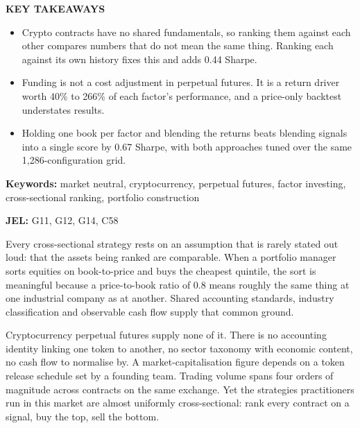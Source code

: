 \documentclass[12pt]{article}
\begin{document}
\vspace{18pt}
\noindent\textbf{KEY TAKEAWAYS}

\begin{itemize}\setlength{\itemsep}{6pt}\setlength{\parskip}{0pt}
\item Crypto contracts have no shared fundamentals, so ranking them against each
other compares numbers that do not mean the same thing. Ranking each against its
own history fixes this and adds 0.44 Sharpe.

\item Funding is not a cost adjustment in perpetual futures. It is a return
driver worth 40\% to 266\% of each factor's performance, and a price-only
backtest understates results.

\item Holding one book per factor and blending the returns beats blending signals
into a single score by 0.67 Sharpe, with both approaches tuned over the same
1,286-configuration grid.
\end{itemize}

\vspace{18pt}
\noindent\textbf{Keywords:} market neutral, cryptocurrency, perpetual futures,
factor investing, cross-sectional ranking, portfolio construction

\noindent\textbf{JEL:} G11, G12, G14, C58

\newpage

\indent Every cross-sectional strategy rests on an assumption that is rarely stated out
loud: that the assets being ranked are comparable. When a portfolio manager sorts
equities on book-to-price and buys the cheapest quintile, the sort is meaningful
because a price-to-book ratio of 0.8 means roughly the same thing at one
industrial company as at another. Shared accounting standards, industry
classification and observable cash flow supply that common ground.

Cryptocurrency perpetual futures supply none of it. There is no accounting
identity linking one token to another, no sector taxonomy with economic content,
no cash flow to normalise by. A market-capitalisation figure depends on a token
release schedule set by a founding team. Trading volume spans four orders of
magnitude across contracts on the same exchange. Yet the strategies practitioners
run in this market are almost uniformly cross-sectional: rank every contract on a
signal, buy the top, sell the bottom.
\end{document}
